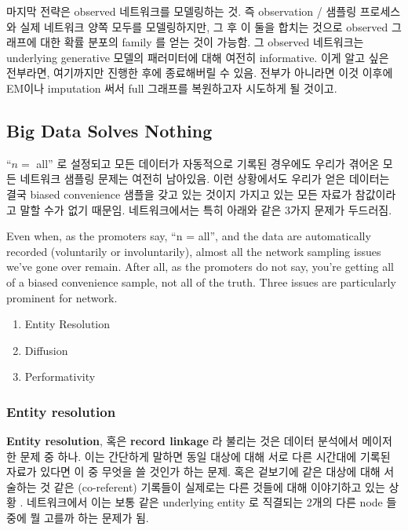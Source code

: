 \documentclass[
]{book}
\providecommand{\tightlist}{%
  \setlength{\itemsep}{0pt}\setlength{\parskip}{0pt}}
\begin{document}
{{{마지막 전략은 observed 네트워크를 모델링하는 것. 즉 observation / 샘플링 프로세스와 실제 네트워크 양쪽 모두를 모델링하지만, 그 후 이 둘을 합치는 것으로 observed 그래프에 대한 확률 분포의 family 를 얻는 것이 가능함. 그 observed 네트워크는 underlying generative 모델의 패러미터에 대해 여전히 informative. 이게 알고 싶은 전부라면, 여기까지만 진행한 후에 종료해버릴 수 있음. 전부가 아니라면 이것 이후에 EM이나 imputation 써서 full 그래프를 복원하고자 시도하게 될 것이고.

\hypertarget{big-data-solves-nothing}{%
\subsection{Big Data Solves Nothing}\label{big-data-solves-nothing}}

``\(n =\) all'' 로 설정되고 모든 데이터가 자동적으로 기록된 경우에도 우리가 겪어온 모든 네트워크 샘플링 문제는 여전히 남아있음. 이런 상황에서도 우리가 얻은 데이터는 결국 biased convenience 샘플을 갖고 있는 것이지 가지고 있는 모든 자료가 참값이라고 말할 수가 없기 때문임. 네트워크에서는 특히 아래와 같은 3가지 문제가 두드러짐.

Even when, as the promoters say, ``n = all'', and the data are automatically recorded (voluntarily or involuntarily), almost all the network sampling issues we've gone over remain. After all, as the promoters do not say, you're getting all of a biased convenience sample, not all of the truth. Three issues are particularly prominent for network.

\begin{enumerate}
\def\labelenumi{\arabic{enumi}.}
\tightlist
\item
  Entity Resolution
\item
  Diffusion
\item
  Performativity
\end{enumerate}

\hypertarget{entity-resolution}{%
\subsubsection{Entity resolution}\label{entity-resolution}}

\textbf{Entity resolution}, 혹은 \textbf{record linkage} 라 불리는 것은 데이터 분석에서 메이저한 문제 중 하나. 이는 간단하게 말하면 동일 대상에 대해 서로 다른 시간대에 기록된 자료가 있다면 이 중 무엇을 쓸 것인가 하는 문제. 혹은 겉보기에 같은 대상에 대해 서술하는 것 같은 (co-referent) 기록들이 실제로는 다른 것들에 대해 이야기하고 있는 상황
. 네트워크에서 이는 보통 같은 underlying entity 로 직결되는 2개의 다른 node 들 중에 뭘 고를까 하는 문제가 됨.

}}}
\end{document}
